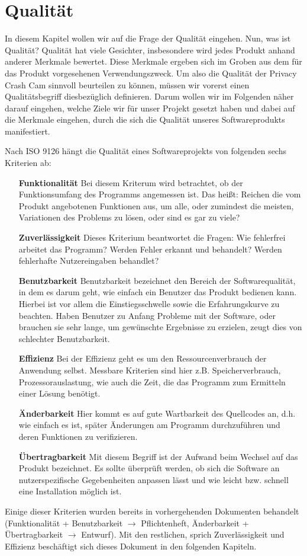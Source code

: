 \chapter{Qualität} \label{Qualitaet}
In diesem Kapitel wollen wir auf die Frage der Qualität eingehen. Nun, was ist Qualität? Qualität hat viele Gesichter, insbesondere wird jedes Produkt anhand
anderer Merkmale bewertet. Diese Merkmale ergeben sich im Groben aus dem für das Produkt vorgesehenen Verwendungszweck. Um also die Qualität der Privacy Crash Cam sinnvoll beurteilen zu können, müssen wir vorerst einen Qualitätsbegriff diesbezüglich definieren. Darum wollen wir im Folgenden näher darauf eingehen, welche Ziele wir für unser Projekt gesetzt haben und dabei auf die Merkmale eingehen, durch die sich die Qualität unseres
Softwareprodukts manifestiert. \\
\par
Nach ISO 9126 hängt die Qualität eines Softwareprojekts von folgenden sechs Kriterien ab:

\begin{itemize}
	\item[\textbf{Funktionalität}] Bei diesem Kriterum wird betrachtet, ob der Funktionsumfang des Programms angemessen ist. Das heißt: Reichen die vom Produkt angebotenen Funktionen aus, um alle, oder zumindest die meisten, Variationen des Problems zu lösen, oder sind
es gar zu viele?
	\item[\textbf{Zuverlässigkeit}] Dieses Kriterium beantwortet die Fragen: Wie fehlerfrei arbeitet das Programm? Werden Fehler erkannt und behandelt? Werden fehlerhafte Nutzereingaben behandlet?
	\item[\textbf{Benutzbarkeit}] Benutzbarkeit bezeichnet den Bereich der Softwarequalität, in dem es darum geht, wie einfach ein Benutzer das Produkt bedienen kann. Hierbei ist vor allem die Einstiegsschwelle sowie die Erfahrungskurve zu beachten. Haben Benutzer zu Anfang Probleme mit der Software, oder brauchen sie sehr lange, um gewünschte Ergebnisse zu erzielen, zeugt
dies von schlechter Benutzbarkeit.
	\item[\textbf{Effizienz}] Bei der Effizienz geht es um den Ressourcenverbrauch der Anwendung
selbst. Messbare Kriterien sind hier z.B. Speicherverbrauch, Prozessorauslastung,
wie auch die Zeit, die das Programm zum Ermitteln einer
Lösung benötigt.
	\item[\textbf{Änderbarkeit}] Hier kommt es auf gute Wartbarkeit des Quellcodes an, d.h. wie einfach es ist, später Änderungen am Programm durchzuführen und deren Funktionen zu verifizieren.
	\item[\textbf{Übertragbarkeit}] Mit diesem Begriff ist der Aufwand beim Wechsel auf
das Produkt bezeichnet. Es sollte überprüft werden, ob sich die Software an nutzerspezifische Gegebenheiten anpassen lässt und wie leicht bzw. schnell eine Installation möglich ist.
\end{itemize}

Einige dieser Kriterien wurden bereits in vorhergehenden Dokumenten behandelt (Funktionalität + Benutzbarkeit $\rightarrow$ Pflichtenheft, Änderbarkeit + Übertragbarkeit $\rightarrow$ Entwurf). Mit den restlichen, sprich Zuverlässigkeit und Effizienz beschäftigt sich dieses Dokument in den folgenden Kapiteln.